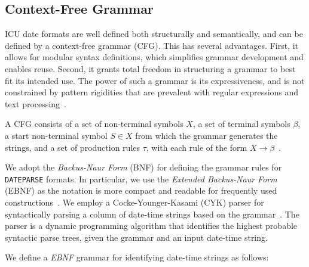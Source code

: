 

\subsection{Context-Free Grammar}
ICU date formats are well defined both structurally and semantically, and can be defined by a context-free grammar (CFG). This has several advantages. First, it allows for modular syntax definitions, which simplifies grammar development and enables reuse. Second, it grants total freedom in structuring a grammar to best fit its intended use. The power of such a grammar is its expressiveness, and is not constrained by pattern rigidities that are prevalent with regular expressions and text processing~\cite{Grune:1990}.


A CFG consists of a set of non-terminal symbols $X$, a set of terminal symbols $\beta$, a start non-terminal symbol $S \in X$ from which the grammar generates the strings, and a set of production rules $\tau$, with each rule of the form $X \rightarrow \beta$~\cite{Hopcroft:1990}. 

We adopt the \textit{Backus-Naur Form} (BNF) for defining the grammar rules for \texttt{DATEPARSE} formats. In particular, we use the \textit{Extended Backus-Naur Form} (EBNF) as the notation is more compact and readable for frequently used constructions~\cite{Grune:1990}. We employ a Cocke-Younger-Kasami (CYK) parser for syntactically parsing a column of date-time strings based on the grammar~\cite{Cocke:1969,Younger67,Kasami:1965}. The parser is a dynamic programming algorithm that identifies the highest probable syntactic parse trees, given the grammar and an input date-time string.


We define a \textit{EBNF} grammar for identifying date-time strings as follows:


